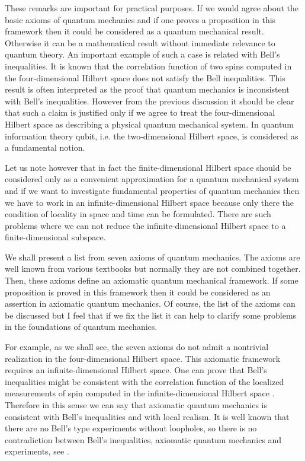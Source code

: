 \documentclass[12pt]{article}
\begin{document}
These remarks are important for practical purposes. If we would
agree about the basic axioms of quantum mechanics and if one
proves a proposition in this framework then it could be considered
as a quantum mechanical result. Otherwise it can be a mathematical
result without immediate relevance to quantum theory. An important
example of such a case is related with Bell's inequalities. It is
known that the correlation function of two spins computed in the
four-dimensional Hilbert space does not satisfy the Bell
inequalities. This result is often interpreted as the proof that
quantum mechanics is inconsistent with Bell's inequalities.
However from the previous discussion it should be clear that such
a claim is justified only if we agree to treat the
four-dimensional Hilbert space as describing a physical quantum
mechanical system. In quantum information theory qubit, i.e. the
two-dimensional Hilbert space, is considered as a fundamental
notion.

Let us note however that in fact the finite-dimensional Hilbert
space should be considered only as a convenient approximation for
a quantum mechanical system and if we want to investigate
fundamental properties of quantum mechanics then we have to work
in an infinite-dimensional Hilbert space because only there the
condition of locality in space and time can be formulated. There
are such problems where we can not reduce the infinite-dimensional
Hilbert space to a finite-dimensional subspace.

We shall present a list from seven axioms of quantum mechanics.
The axioms  are well known from various textbooks but normally
they are not combined together. Then, these axioms define an
axiomatic quantum mechanical framework. If some proposition is
proved in this framework then it could be considered as an
assertion in axiomatic quantum mechanics. Of course, the list of
the axioms can be discussed but I feel that if we fix the list it
can help to clarify some problems in the foundations of quantum
mechanics.

For example, as we shall see, the seven axioms do not admit a
nontrivial realization  in the four-dimensional Hilbert space.
This axiomatic framework requires an infinite-dimensional Hilbert
space. One can prove that Bell's inequalities might be consistent
with the correlation function of the localized measurements of
spin computed in the infinite-dimensional Hilbert space \cite{Vol,
Vol2}. Therefore in this sense we can say that axiomatic quantum
mechanics is consistent with Bell's inequalities and with local
realism. It is well known that there are no Bell's type
experiments without loopholes, so there is no contradiction
between Bell's inequalities, axiomatic quantum mechanics and
experiments, see \cite{KhV}.
\end{document}
